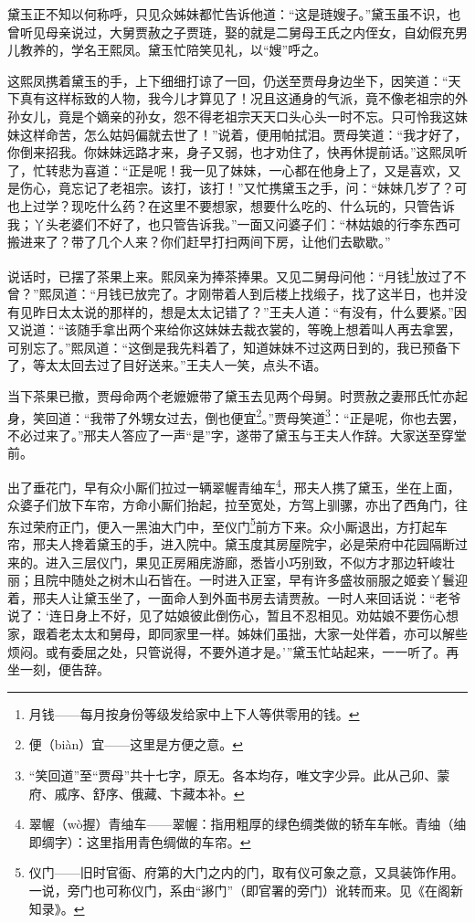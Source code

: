 \par 黛玉正不知以何称呼，只见众姊妹都忙告诉他道：“这是琏嫂子。”黛玉虽不识，也曾听见母亲说过，大舅贾赦之子贾琏，娶的就是二舅母王氏之内侄女，自幼假充男儿教养的，学名王熙凤。黛玉忙陪笑见礼，以“嫂”呼之。
\par 这熙凤携着黛玉的手，上下细细打谅了一回，仍送至贾母身边坐下，因笑道：“天下真有这样标致的人物，我今儿才算见了！况且这通身的气派，竟不像老祖宗的外孙女儿，竟是个嫡亲的孙女，怨不得老祖宗天天口头心头一时不忘。只可怜我这妹妹这样命苦，怎么姑妈偏就去世了！”说着，便用帕拭泪。贾母笑道：“我才好了，你倒来招我。你妹妹远路才来，身子又弱，也才劝住了，快再休提前话。”这熙凤听了，忙转悲为喜道：“正是呢！我一见了妹妹，一心都在他身上了，又是喜欢，又是伤心，竟忘记了老祖宗。该打，该打！”又忙携黛玉之手，问：“妹妹几岁了？可也上过学？现吃什么药？在这里不要想家，想要什么吃的、什么玩的，只管告诉我；丫头老婆们不好了，也只管告诉我。”一面又问婆子们：“林姑娘的行李东西可搬进来了？带了几个人来？你们赶早打扫两间下房，让他们去歇歇。”
\par 说话时，已摆了茶果上来。熙凤亲为捧茶捧果。又见二舅母问他：“月钱\footnote{月钱——每月按身份等级发给家中上下人等供零用的钱。}放过了不曾？”熙凤道：“月钱已放完了。才刚带着人到后楼上找缎子，找了这半日，也并没有见昨日太太说的那样的，想是太太记错了？”王夫人道：“有没有，什么要紧。”因又说道：“该随手拿出两个来给你这妹妹去裁衣裳的，等晚上想着叫人再去拿罢，可别忘了。”熙凤道：“这倒是我先料着了，知道妹妹不过这两日到的，我已预备下了，等太太回去过了目好送来。”王夫人一笑，点头不语。
\par 当下茶果已撤，贾母命两个老嬷嬷带了黛玉去见两个母舅。时贾赦之妻邢氏忙亦起身，笑回道：“我带了外甥女过去，倒也便宜\footnote{便（biàn）宜——这里是方便之意。}。”贾母笑道\footnote{“笑回道”至“贾母”共十七字，原无。各本均存，唯文字少异。此从己卯、蒙府、戚序、舒序、俄藏、卞藏本补。}：“正是呢，你也去罢，不必过来了。”邢夫人答应了一声“是”字，遂带了黛玉与王夫人作辞。大家送至穿堂前。
\par 出了垂花门，早有众小厮们拉过一辆翠幄青䌷车\footnote{翠幄（wò握）青䌷车——翠幄：指用粗厚的绿色绸类做的轿车车帐。青䌷（䌷即绸字）：这里指用青色绸做的车帘。}，邢夫人携了黛玉，坐在上面，众婆子们放下车帘，方命小厮们抬起，拉至宽处，方驾上驯骡，亦出了西角门，往东过荣府正门，便入一黑油大门中，至仪门\footnote{仪门——旧时官衙、府第的大门之内的门，取有仪可象之意，又具装饰作用。一说，旁门也可称仪门，系由“謻门”（即官署的旁门）讹转而来。见《在阁新知录》。}前方下来。众小厮退出，方打起车帘，邢夫人搀着黛玉的手，进入院中。黛玉度其房屋院宇，必是荣府中花园隔断过来的。进入三层仪门，果见正房厢庑游廊，悉皆小巧别致，不似方才那边轩峻壮丽；且院中随处之树木山石皆在。一时进入正室，早有许多盛妆丽服之姬妾丫鬟迎着，邢夫人让黛玉坐了，一面命人到外面书房去请贾赦。一时人来回话说：“老爷说了：‘连日身上不好，见了姑娘彼此倒伤心，暂且不忍相见。劝姑娘不要伤心想家，跟着老太太和舅母，即同家里一样。姊妹们虽拙，大家一处伴着，亦可以解些烦闷。或有委屈之处，只管说得，不要外道才是。’”黛玉忙站起来，一一听了。再坐一刻，便告辞。
